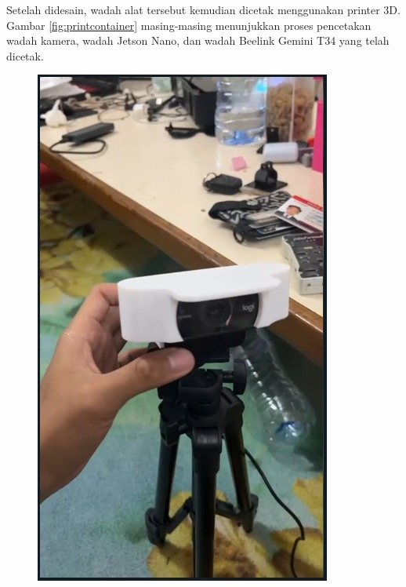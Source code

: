 Setelah didesain, wadah alat tersebut kemudian dicetak menggunakan printer 3D. Gambar \ref{fig:printcontainer} masing-masing menunjukkan proses pencetakan wadah kamera, wadah Jetson Nano, dan wadah Beelink Gemini T34 yang telah dicetak.

\begin{figure}
  \centering

  \includegraphics[scale=0.37]{gambar/bab3-case-camera-printed.jpeg}

\end{figure}
